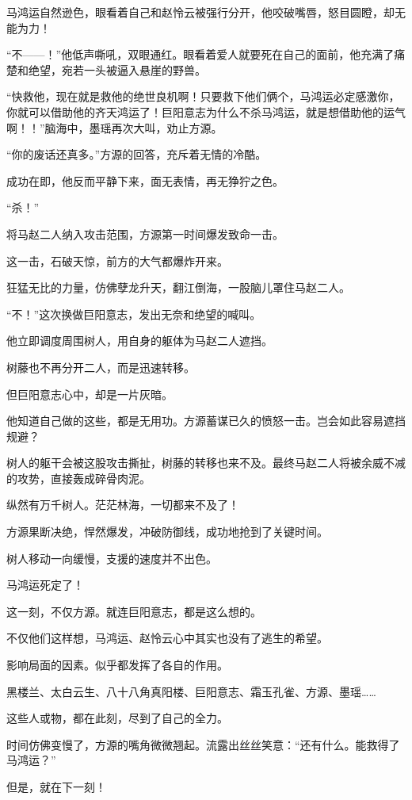 \begin{this_body}
马鸿运自然逊色，眼看着自己和赵怜云被强行分开，他咬破嘴唇，怒目圆瞪，却无能为力！

“不——！”他低声嘶吼，双眼通红。眼看着爱人就要死在自己的面前，他充满了痛楚和绝望，宛若一头被逼入悬崖的野兽。

“快救他，现在就是救他的绝世良机啊！只要救下他们俩个，马鸿运必定感激你，你就可以借助他的齐天鸿运了！巨阳意志为什么不杀马鸿运，就是想借助他的运气啊！！”脑海中，墨瑶再次大叫，劝止方源。

“你的废话还真多。”方源的回答，充斥着无情的冷酷。

成功在即，他反而平静下来，面无表情，再无狰狞之色。

“杀！”

将马赵二人纳入攻击范围，方源第一时间爆发致命一击。

这一击，石破天惊，前方的大气都爆炸开来。

狂猛无比的力量，仿佛孽龙升天，翻江倒海，一股脑儿罩住马赵二人。

“不！”这次换做巨阳意志，发出无奈和绝望的喊叫。

他立即调度周围树人，用自身的躯体为马赵二人遮挡。

树藤也不再分开二人，而是迅速转移。

但巨阳意志心中，却是一片灰暗。

他知道自己做的这些，都是无用功。方源蓄谋已久的愤怒一击。岂会如此容易遮挡规避？

树人的躯干会被这股攻击撕扯，树藤的转移也来不及。最终马赵二人将被余威不减的攻势，直接轰成碎骨肉泥。

纵然有万千树人。茫茫林海，一切都来不及了！

方源果断决绝，悍然爆发，冲破防御线，成功地抢到了关键时间。

树人移动一向缓慢，支援的速度并不出色。

马鸿运死定了！

这一刻，不仅方源。就连巨阳意志，都是这么想的。

不仅他们这样想，马鸿运、赵怜云心中其实也没有了逃生的希望。

影响局面的因素。似乎都发挥了各自的作用。

黑楼兰、太白云生、八十八角真阳楼、巨阳意志、霜玉孔雀、方源、墨瑶……

这些人或物，都在此刻，尽到了自己的全力。

时间仿佛变慢了，方源的嘴角微微翘起。流露出丝丝笑意：“还有什么。能救得了马鸿运？”

但是，就在下一刻！


\end{this_body}
